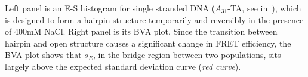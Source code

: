 \label{fig:bva_dynamic} Left panel is an E-S histogram for single stranded DNA ($A_{31}$-TA, see in~\cite{Tsukanov_2013}), which is designed to form a hairpin structure temporarily and reversibly in the presence of 400mM NaCl. Right panel is its BVA plot. Since the transition between hairpin and open structure causes a significant change in FRET efficiency, the BVA plot shows that $s_E$, in the bridge region between two populations, sits largely above the expected standard deviation curve (\textit{red curve}).